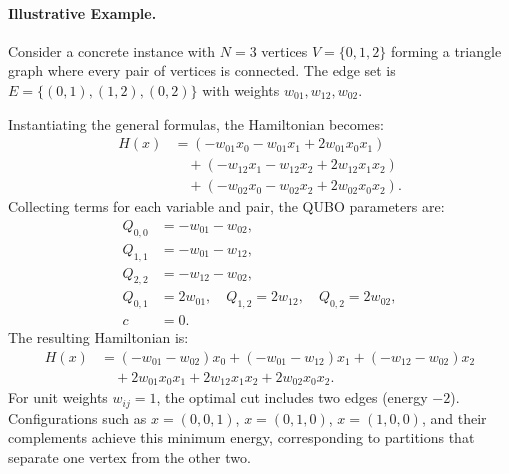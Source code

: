 \documentclass[12pt]{article}
\begin{document}
\paragraph{Illustrative Example.}
Consider a concrete instance with $N=3$ vertices $V=\{0,1,2\}$ forming a triangle graph where every pair of vertices is connected. The edge set is $E=\{(0,1), (1,2), (0,2)\}$ with weights $w_{01}, w_{12}, w_{02}$.

Instantiating the general formulas, the Hamiltonian becomes:
\begin{align}
H(x) &= \left( -w_{01}x_0 - w_{01}x_1 + 2w_{01}x_0x_1 \right) \nonumber \\
&\quad + \left( -w_{12}x_1 - w_{12}x_2 + 2w_{12}x_1x_2 \right) \nonumber \\
&\quad + \left( -w_{02}x_0 - w_{02}x_2 + 2w_{02}x_0x_2 \right).
\end{align}
Collecting terms for each variable and pair, the QUBO parameters are:
\begin{align}
Q_{0,0} &= -w_{01} - w_{02}, \\
Q_{1,1} &= -w_{01} - w_{12}, \\
Q_{2,2} &= -w_{12} - w_{02}, \\
Q_{0,1} &= 2w_{01}, \quad Q_{1,2} = 2w_{12}, \quad Q_{0,2} = 2w_{02}, \\
c &= 0.
\end{align}
The resulting Hamiltonian is:
\begin{align}
H(x) &= (-w_{01}-w_{02})x_0 + (-w_{01}-w_{12})x_1 + (-w_{12}-w_{02})x_2 \nonumber \\
&\quad + 2w_{01}x_0x_1 + 2w_{12}x_1x_2 + 2w_{02}x_0x_2.
\end{align}
For unit weights $w_{ij}=1$, the optimal cut includes two edges (energy $-2$). Configurations such as $x=(0,0,1)$, $x=(0,1,0)$, $x=(1,0,0)$, and their complements achieve this minimum energy, corresponding to partitions that separate one vertex from the other two.
\end{document}

